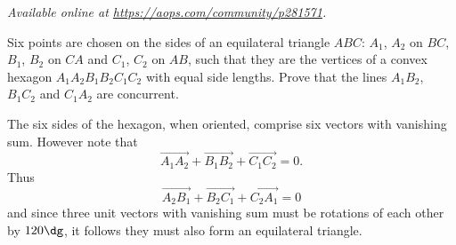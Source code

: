 \textsl{Available online at \url{https://aops.com/community/p281571}.}
\begin{mdframed}[style=mdpurplebox,frametitle={Problem statement}]
Six points are chosen on the sides of an equilateral triangle $ABC$:
$A_1$, $A_2$ on $BC$, $B_1$, $B_2$ on $CA$ and $C_1$, $C_2$ on $AB$,
such that they are the vertices of a
convex hexagon $A_1A_2B_1B_2C_1C_2$ with equal side lengths.
Prove that the lines $A_1B_2$, $B_1C_2$ and $C_1A_2$ are concurrent.
\end{mdframed}
The six sides of the hexagon, when oriented, comprise
six vectors with vanishing sum.
However note that \[ \overrightarrow{A_1A_2}
+ \overrightarrow{B_1B_2}
+ \overrightarrow{C_1C_2} = 0. \]
Thus
\[ \overrightarrow{A_2B_1} + \overrightarrow{B_2C_1} +
\overrightarrow{C_2A_1} = 0 \]
and since three unit vectors with vanishing sum
must be rotations of each other by $120\dg$,
it follows they must also form an equilateral triangle.

